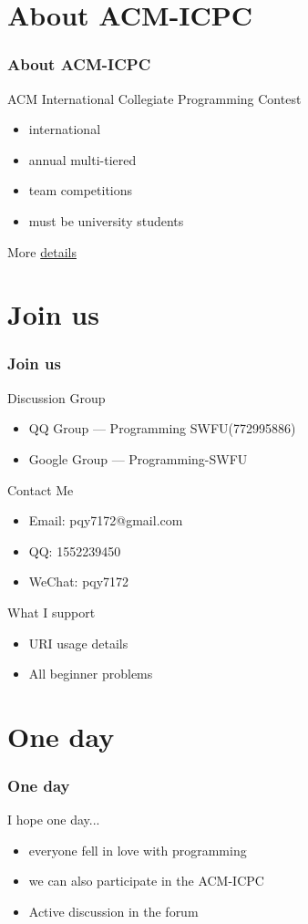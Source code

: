 \documentclass{beamer}
\begin{document}
\section{About ACM-ICPC}
\begin{frame}
  \frametitle{About ACM-ICPC}
  \Large {ACM International Collegiate Programming Contest}
  \begin{itemize}
  \item international 
  \item annual multi-tiered
  \item team competitions
  \item must be university students
  \end{itemize}
  More \href{https://en.wikipedia.org/wiki/ACM_International_Collegiate_Programming_Contest}{details}
\end{frame}


\section{Join us}
\begin{frame}
  \frametitle{Join us}
  Discussion Group
  \begin{itemize}
  \item QQ Group --- Programming SWFU(772995886)
  \item Google Group --- Programming-SWFU
  \end{itemize}
  Contact Me
  \begin{itemize}
  \item Email: pqy7172@gmail.com
  \item QQ: 1552239450
  \item WeChat: pqy7172
  \end{itemize}
  What I support
  \begin{itemize}
  \item URI usage details
  \item All beginner problems
  \end{itemize}
\end{frame}



\section{One day}
\begin{frame}
  \frametitle{One day}
  I hope one day...
\begin{itemize}
\item everyone fell in love with programming
\item we can also participate in the ACM-ICPC
\item Active discussion in the forum
  
\end{itemize}
\end{frame}
\end{document}
